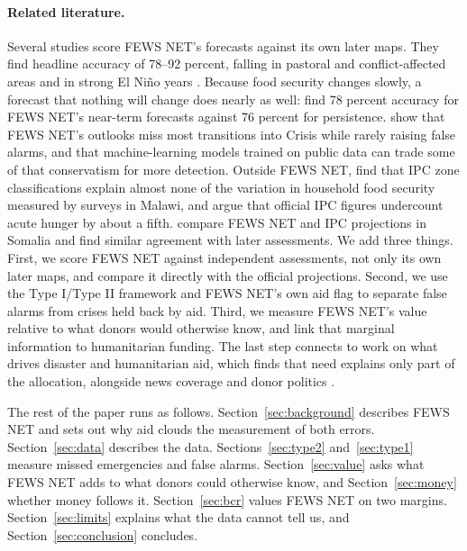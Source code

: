 \documentclass[11pt]{article}
\begin{document}
\paragraph{Related literature.} Several studies score FEWS NET's forecasts against its own later maps. They find headline accuracy of 78--92 percent, falling in pastoral and conflict-affected areas and in strong El Ni\~no years \citep{choularton2019,krishnamurthy2020,backer2021,bertetti2024}. Because food security changes slowly, a forecast that nothing will change does nearly as well: \citet{bertetti2024} find 78 percent accuracy for FEWS NET's near-term forecasts against 76 percent for persistence. \citet{andree2020} show that FEWS NET's outlooks miss most transitions into Crisis while rarely raising false alarms, and that machine-learning models trained on public data can trade some of that conservatism for more detection. Outside FEWS NET, \citet{lentz2019} find that IPC zone classifications explain almost none of the variation in household food security measured by surveys in Malawi, and \citet{lentz2025} argue that official IPC figures undercount acute hunger by about a fifth. \citet{seyffer2026} compare FEWS NET and IPC projections in Somalia and find similar agreement with later assessments. We add three things. First, we score FEWS NET against independent assessments, not only its own later maps, and compare it directly with the official projections. Second, we use the Type I/Type II framework and FEWS NET's own aid flag to separate false alarms from crises held back by aid. Third, we measure FEWS NET's value relative to what donors would otherwise know, and link that marginal information to humanitarian funding. The last step connects to work on what drives disaster and humanitarian aid, which finds that need explains only part of the allocation, alongside news coverage and donor politics \citep{eisensee2007news,drury2005politics,fink2011determinants}.

The rest of the paper runs as follows. Section~\ref{sec:background} describes FEWS NET and sets out why aid clouds the measurement of both errors. Section~\ref{sec:data} describes the data. Sections~\ref{sec:type2} and~\ref{sec:type1} measure missed emergencies and false alarms. Section~\ref{sec:value} asks what FEWS NET adds to what donors could otherwise know, and Section~\ref{sec:money} whether money follows it. Section~\ref{sec:bcr} values FEWS NET on two margins. Section~\ref{sec:limits} explains what the data cannot tell us, and Section~\ref{sec:conclusion} concludes.
\end{document}
